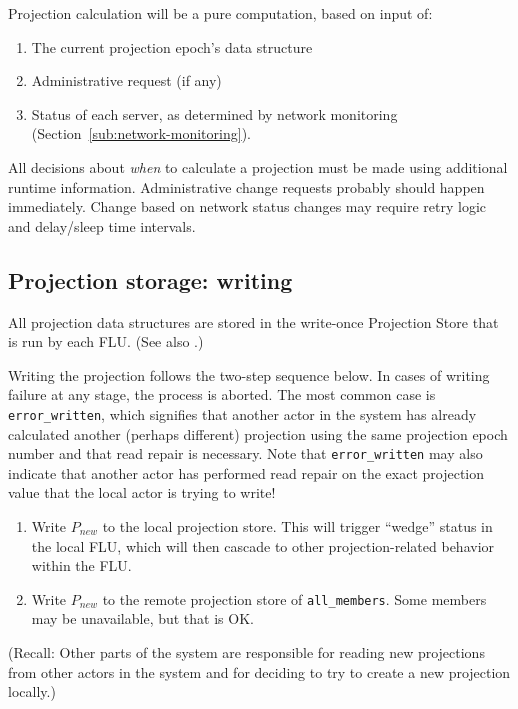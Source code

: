 \documentclass[preprint,10pt]{sigplanconf}
\begin{document}
Projection calculation will be a pure computation, based on input of:

\begin{enumerate}
\item The current projection epoch's data structure
\item Administrative request (if any)
\item Status of each server, as determined by network monitoring
(Section~\ref{sub:network-monitoring}).
\end{enumerate}

All decisions about {\em when} to calculate a projection must be made
using additional runtime information.  Administrative change requests
probably should happen immediately.  Change based on network status
changes may require retry logic and delay/sleep time intervals.

\subsection{Projection storage: writing}
\label{sub:proj-storage-writing}

All projection data structures are stored in the write-once Projection
Store that is run by each FLU.  (See also \cite{machi-design}.)

Writing the projection follows the two-step sequence below.
In cases of writing
failure at any stage, the process is aborted.  The most common case is
{\tt error\_written}, which signifies that another actor in the system has
already calculated another (perhaps different) projection using the
same projection epoch number and that
read repair is necessary.  Note that {\tt error\_written} may also
indicate that another actor has performed read repair on the exact
projection value that the local actor is trying to write!

\begin{enumerate}
\item Write $P_{new}$ to the local projection store.  This will trigger
  ``wedge'' status in the local FLU, which will then cascade to other
  projection-related behavior within the FLU.
\item Write $P_{new}$ to the remote projection store of {\tt all\_members}.
  Some members may be unavailable, but that is OK.
\end{enumerate}

(Recall: Other parts of the system are responsible for reading new
projections from other actors in the system and for deciding to try to
create a new projection locally.)
\end{document}

